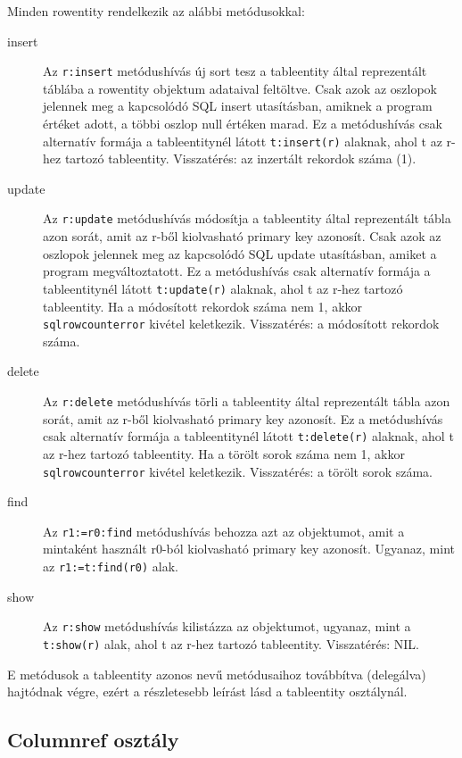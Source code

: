 Minden rowentity rendelkezik az alábbi metódusokkal: 
\begin{description}
\item[insert]
    Az \verb!r:insert! metódushívás új sort tesz a tableentity
    által reprezentált táblába a rowentity objektum adataival feltöltve.
    Csak azok az oszlopok jelennek meg a kapcsolódó SQL insert utasításban, 
    amiknek a program értéket adott, a többi oszlop null értéken marad.
    Ez a metódushívás csak alternatív formája a tableentitynél látott
    \verb!t:insert(r)! alaknak, ahol t az r-hez tartozó tableentity.
    Visszatérés: az inzertált rekordok száma (1).
\item[update]
    Az \verb!r:update! metódushívás módosítja a tableentity
    által reprezentált tábla azon sorát, amit az r-ből kiolvasható
    primary key azonosít. Csak azok az oszlopok jelennek meg az kapcsolódó
    SQL update utasításban, amiket a program megváltoztatott.
    Ez a metódushívás csak alternatív formája a tableentitynél látott
    \verb!t:update(r)! alaknak, ahol t az r-hez tartozó tableentity.
    Ha a módosított rekordok száma nem 1, akkor \verb!sqlrowcounterror! kivétel 
    keletkezik. Visszatérés: a módosított rekordok száma.
\item[delete]
    Az \verb!r:delete! metódushívás törli a tableentity
    által reprezentált tábla azon sorát, amit az r-ből kiolvasható
    primary key azonosít.
    Ez a metódushívás csak alternatív formája a tableentitynél látott
    \verb!t:delete(r)! alaknak, ahol t az r-hez tartozó tableentity.
    Ha a törölt sorok száma nem 1, akkor \verb!sqlrowcounterror! kivétel 
    keletkezik. Visszatérés: a törölt sorok száma.
\item[find]
    Az \verb!r1:=r0:find! metódushívás behozza azt az objektumot,
    amit a mintaként használt r0-ból kiolvasható primary key
    azonosít. Ugyanaz, mint az \verb!r1:=t:find(r0)! alak.
\item[show]
    Az \verb!r:show! metódushívás kilistázza az objektumot, ugyanaz, 
    mint a \verb!t:show(r)! alak, ahol t az r-hez tartozó tableentity.
    Visszatérés: NIL.
\end{description}

E metódusok a tableentity azonos nevű metódusaihoz továbbítva (delegálva)
hajtódnak végre, ezért a részletesebb leírást lásd a tableentity
osztálynál.


\subsection{Columnref osztály}

